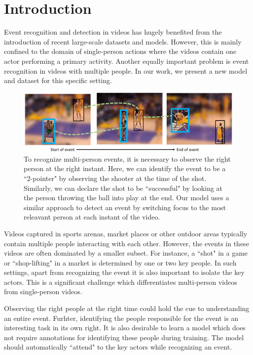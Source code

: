 
\section{Introduction}

Event recognition and detection in videos has hugely benefited from the
introduction of recent large-scale datasets \cite{THUMOS,UCF101,Karpathy_CVPR14,MED11} and models.
However, this is mainly confined to the domain of single-person actions
where the videos contain one actor performing a primary activity.
Another equally important problem is event recognition in
videos with multiple people. In our work, we present a new model
and dataset for this specific setting.

\begin{figure}[ht!]
\begin{center}
  \includegraphics[width=3.5 in]{images/pull_figure_v2_cropped.pdf}
\end{center}
\caption{To recognize multi-person events, it is necessary to observe the right
person at the right instant. Here, we can identify the
event to be a ``2-pointer" by observing the shooter at the time of the shot.
Similarly, we can declare the shot to be ``successful" by looking at the
person throwing the ball into play at the end. Our model uses a similar approach to detect
an event by switching focus to the most releavant person at each instant of the video.}
\label{fig:pull_figure}
\end{figure}

Videos captured in sports arenas, market places or other outdoor areas
typically contain multiple people interacting with each other.
However, the events in these videos are often
dominated by a smaller subset. For instance, a ``shot" in a game
or ``shop-lifting" in a market is determined by one or two key people.
In such settings, apart from recognizing the event it is also important
to isolate the key actors. This is a significant challenge which
differentiates multi-person videos from single-person videos.

Observing the right people at the right time could hold the cue to
understanding an entire event. Furhter, identifying the people responsible for
the event is an interesting task in its own right.  It is also desirable to
learn a model which does not require annotations for identifying these people during
training. The model should automatically ``attend" to the key actors while recognizing an event.

